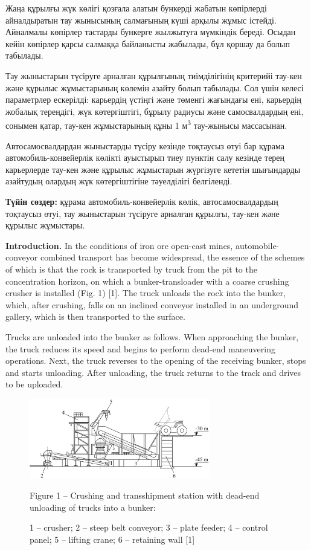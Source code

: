 Жаңа құрылғы жүк көлігі қозғала алатын бункерді жабатын көпірлерді
айналдыратын тау жынысының салмағының күші арқылы жұмыс істейді.
Айналмалы көпірлер тастарды бункерге жылжытуға мүмкіндік береді. Осыдан
кейін көпірлер қарсы салмаққа байланысты жабылады, бұл қоршау да болып
табылады.

Тау жыныстарын түсіруге арналған құрылғының тиімділігінің критерийі
тау-кен және құрылыс жұмыстарының көлемін азайту болып табылады. Сол
үшін келесі параметрлер ескерілді: карьердің үстіңгі және төменгі
жағындағы ені, карьердің жобалық тереңдігі, жүк көтергіштігі, бұрылу
радиусы және самосвалдардың ені, сонымен қатар, тау-кен жұмыстарының
құны 1 м\textsuperscript{3} тау-жынысы массасынан.

Автосамосвалдардан жыныстарды түсіру кезінде тоқтаусыз өтуі бар құрама
автомобиль-конвейерлік көлікті ауыстырып тиеу пунктін салу кезінде терең
карьерлерде тау-кен және құрылыс жұмыстарын жүргізуге кететін шығындарды
азайтудың олардың жүк көтергіштігіне тәуелділігі белгіленді.

{\bfseries Түйін сөздер:} құрама автомобиль-конвейерлік көлік,
автосамосвалдардың тоқтаусыз өтуі, тау жыныстарын түсіруге арналған
құрылғы, тау-кен және құрылыс жұмыстары.

\begin{multicols}{2}
{\bfseries Introduction.} In the conditions of iron ore open-cast mines,
automobile-conveyor combined transport has become widespread, the
essence of the schemes of which is that the rock is transported by truck
from the pit to the concentration horizon, on which a bunker-transloader
with a coarse crushing crusher is installed (Fig. 1) {[}1{]}. The truck
unloads the rock into the bunker, which, after crushing, falls on an
inclined conveyor installed in an underground gallery, which is then
transported to the surface.

Trucks are unloaded into the bunker as follows. When approaching the
bunker, the truck reduces its speed and begins to perform dead-end
maneuvering operations. Next, the truck reverses to the opening of the
receiving bunker, stops and starts unloading. After unloading, the truck
returns to the track and drives to be uploaded.
\end{multicols}

\begin{figure}[H]
	\centering
	\includegraphics[width=0.7\textwidth]{assets/1350}
	\caption*{Figure 1 -- Crushing and transshipment station with dead-end unloading of trucks into a bunker:}
	\caption*{1 -- crusher; 2 -- steep belt conveyor; 3 -- plate feeder; 4 -- control panel; 5 -- lifting crane; 6 -- retaining wall {[}1{]}}
\end{figure}

